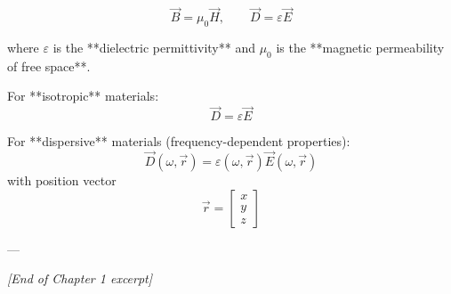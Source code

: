 \[
\vec{B} = \mu_0 \vec{H}, \qquad
\vec{D} = \varepsilon \vec{E}
\]

where $\varepsilon$ is the **dielectric permittivity** and $\mu_0$ is the **magnetic permeability of free space**.

For **isotropic** materials:
\[
\vec{D} = \varepsilon \vec{E}
\]

For **dispersive** materials (frequency-dependent properties):
\[
\vec{D}(\omega, \vec{r}) = \varepsilon(\omega, \vec{r}) \vec{E}(\omega, \vec{r})
\]
with position vector
\[
\vec{r} = 
\begin{bmatrix}
x \\ y \\ z
\end{bmatrix}
\]

---

\noindent\textit{[End of Chapter 1 excerpt]}

